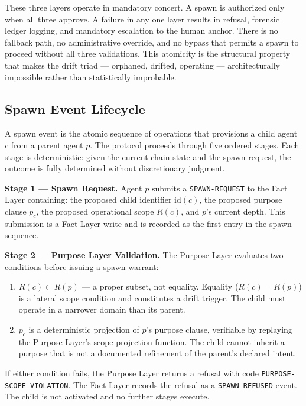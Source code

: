 These three layers operate in mandatory concert. A spawn is authorized only when all three approve. A failure in any one layer results in refusal, forensic ledger logging, and mandatory escalation to the human anchor. There is no fallback path, no administrative override, and no bypass that permits a spawn to proceed without all three validations. This atomicity is the structural property that makes the drift triad — orphaned, drifted, operating — architecturally impossible rather than statistically improbable.

\subsection{Spawn Event Lifecycle}

A spawn event is the atomic sequence of operations that provisions a child agent $c$ from a parent agent $p$. The protocol proceeds through five ordered stages. Each stage is deterministic: given the current chain state and the spawn request, the outcome is fully determined without discretionary judgment.

\bigskip
\noindent\textbf{Stage 1 — Spawn Request.} Agent $p$ submits a \texttt{SPAWN-REQUEST} to the Fact Layer containing: the proposed child identifier $\mathrm{id}(c)$, the proposed purpose clause $p_c$, the proposed operational scope $R(c)$, and $p$'s current depth. This submission is a Fact Layer write and is recorded as the first entry in the spawn sequence.

\bigskip
\noindent\textbf{Stage 2 — Purpose Layer Validation.} The Purpose Layer evaluates two conditions before issuing a spawn warrant:

\begin{enumerate}
  \item[(PL-V1)] $R(c) \subset R(p)$ — a proper subset, not equality. Equality ($R(c) = R(p)$) is a lateral scope condition and constitutes a drift trigger. The child must operate in a narrower domain than its parent.

  \item[(PL-V2)] $p_c$ is a deterministic projection of $p$'s purpose clause, verifiable by replaying the Purpose Layer's scope projection function. The child cannot inherit a purpose that is not a documented refinement of the parent's declared intent.
\end{enumerate}

If either condition fails, the Purpose Layer returns a refusal with code \texttt{PURPOSE-SCOPE-VIOLATION}. The Fact Layer records the refusal as a \texttt{SPAWN-REFUSED} event. The child is not activated and no further stages execute.

